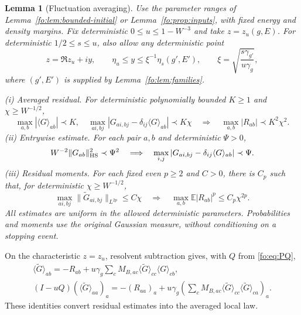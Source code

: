 \documentclass[11pt]{article}
\numberwithin{equation}{section}
\newtheorem{lemma}[theorem]{Lemma}
\theoremstyle{remark}
\newcommand{\E}{\mathbb E}
\newcommand{\wt}{\widetilde}
\begin{document}
\begin{lemma}[Fluctuation averaging]\label{gc:lem:residual}
Use the parameter ranges of Lemma~\ref{fo:lem:bounded-initial} or
Lemma~\ref{fo:prop:inputs}, with fixed energy and density margins.
Fix deterministic $0\le u\le1-W^{-3}$ and take $z=z_u(g,E)$.
For deterministic $1/2\le s\le u$, also allow any deterministic point
\[
 z=\Re z_u+iy,\qquad
 \eta_u\le y\le\xi^{-1}\eta_s(g',E'),\qquad
 \xi=\sqrt{\frac{s\gamma_{g'}}{u\gamma_g}},
\]
where $(g',E')$ is supplied by Lemma~\ref{fo:lem:families}.

\noindent\textup{(i) Averaged residual.}
For deterministic polynomially bounded $K\ge1$ and $\chi\ge W^{-1/2}$,
\begin{equation}\label{gc:eq:averaging-input}
 \max_{a,b}|\langle G\rangle_{ab}|\prec K,\quad
 \max_{ai,bj}|G_{ai,bj}-\delta_{ij}\langle G\rangle_{ab}|\prec K\chi
 \quad\Longrightarrow\quad
 \max_{a,b}|R_{ab}|\prec K^2\chi^2.
\end{equation}
\noindent\textup{(ii) Entrywise estimate.}
For each pair $a,b$ and deterministic $\Psi>0$,
\begin{equation}\label{gc:eq:haar}
 W^{-2}\|G_{ab}\|_{\rm HS}^2\prec\Psi^2
 \quad\Longrightarrow\quad
 \max_{i,j}|G_{ai,bj}-\delta_{ij}\langle G\rangle_{ab}|\prec\Psi.
\end{equation}
\noindent\textup{(iii) Residual moments.}
For each fixed even $p\ge2$ and $C>0$, there is $C_p$ such that,
for deterministic $\chi\ge W^{-1/2}$,
\begin{equation}\label{fo:eq:residual-moments}
 \max_{ai,bj}\|\wt G_{ai,bj}\|_{L^{2p}}\le C\chi
 \quad\Longrightarrow\quad
 \max_{a,b}\E|R_{ab}|^p\le C_p\chi^{2p}.
\end{equation}
All estimates are uniform in the allowed deterministic parameters.
Probabilities and moments use the original Gaussian measure, without
conditioning on a stopping event.
\end{lemma}

On the characteristic $z=z_u$, resolvent subtraction gives, with
$Q$ from \eqref{fo:eq:PQ},
\begin{equation}\label{gc:eq:scalar}
 \begin{gathered}
 \langle\wt G\rangle_{ab}
 =-R_{ab}+u\gamma_g\sum_cM_{B,ac}
       \langle\wt G\rangle_{cc}\langle G\rangle_{cb},\\
 (I-uQ)(\langle\wt G\rangle_{aa})_a=-(R_{aa})_a
       +u\gamma_g\left(\sum_cM_{B,ac}
         \langle\wt G\rangle_{cc}\langle\wt G\rangle_{ca}\right)_a.
 \end{gathered}
\end{equation}
These identities convert residual estimates into the averaged local law.
\end{document}

